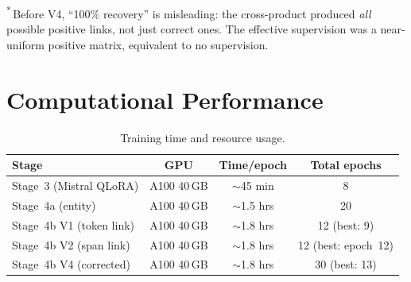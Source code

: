 \noindent\textsuperscript{*}\,Before V4, ``100\% recovery'' is misleading:
the cross-product produced \emph{all} possible positive links, not just
correct ones.  The effective supervision was a near-uniform positive matrix,
equivalent to no supervision.

\section{Computational Performance}
\label{sec:computational}

\begin{table}[ht]
  \centering
  \caption{Training time and resource usage.}
  \label{tab:compute}
  \begin{tabular}{@{}lccc@{}}
    \toprule
    \textbf{Stage} & \textbf{GPU} & \textbf{Time/epoch} & \textbf{Total epochs} \\
    \midrule
    Stage~3 (Mistral QLoRA) & A100 40\,GB & $\sim$45 min & 8 \\
    Stage~4a (entity) & A100 40\,GB & $\sim$1.5 hrs & 20 \\
    Stage~4b V1 (token link) & A100 40\,GB & $\sim$1.8 hrs & 12 (best: 9) \\
    Stage~4b V2 (span link) & A100 40\,GB & $\sim$1.8 hrs & 12 (best: epoch~12) \\
    Stage~4b V4 (corrected) & A100 40\,GB & $\sim$1.8 hrs & 30 (best: 13) \\
    \bottomrule
  \end{tabular}
\end{table}

